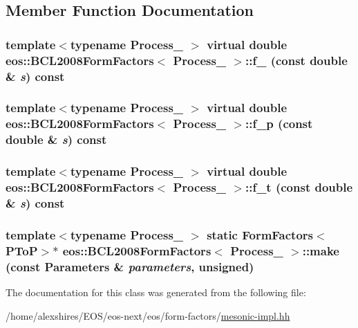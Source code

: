 \subsection{Member Function Documentation}
\hypertarget{classeos_1_1BCL2008FormFactors_a94ccfc9217b04b4a78a67d913cb77d64}{
\subsubsection[{f\_\-0}]{\setlength{\rightskip}{0pt plus 5cm}template$<$typename Process\_\- $>$ virtual double {\bf eos::BCL2008FormFactors}$<$ Process\_\- $>$::f\_ (const double \& {\em s}) const}}
\label{classeos_1_1BCL2008FormFactors_a94ccfc9217b04b4a78a67d913cb77d64}
\hypertarget{classeos_1_1BCL2008FormFactors_abddd45b1faae773718c4eb7ee2eacb9a}{
\subsubsection[{f\_\-p}]{\setlength{\rightskip}{0pt plus 5cm}template$<$typename Process\_\- $>$ virtual double {\bf eos::BCL2008FormFactors}$<$ Process\_\- $>$::f\_\-p (const double \& {\em s}) const}}
\label{classeos_1_1BCL2008FormFactors_abddd45b1faae773718c4eb7ee2eacb9a}
\hypertarget{classeos_1_1BCL2008FormFactors_a2e9c26cfe8867360ee8a8af4a6a649b5}{
\subsubsection[{f\_\-t}]{\setlength{\rightskip}{0pt plus 5cm}template$<$typename Process\_\- $>$ virtual double {\bf eos::BCL2008FormFactors}$<$ Process\_\- $>$::f\_\-t (const double \& {\em s}) const}}
\label{classeos_1_1BCL2008FormFactors_a2e9c26cfe8867360ee8a8af4a6a649b5}
\hypertarget{classeos_1_1BCL2008FormFactors_afc38a15ec961d9677b443f9d2ca05c4a}{
\subsubsection[{make}]{\setlength{\rightskip}{0pt plus 5cm}template$<$typename Process\_\- $>$ static FormFactors$<${\bf PToP}$>$$\ast$ {\bf eos::BCL2008FormFactors}$<$ Process\_\- $>$::make (const {\bf Parameters} \& {\em parameters}, \/  unsigned)}}
\label{classeos_1_1BCL2008FormFactors_afc38a15ec961d9677b443f9d2ca05c4a}


The documentation for this class was generated from the following file:\begin{DoxyCompactItemize}
\item 
/home/alexshires/EOS/eos-\/next/eos/form-\/factors/\hyperlink{mesonic-impl_8hh}{mesonic-\/impl.hh}\end{DoxyCompactItemize}
